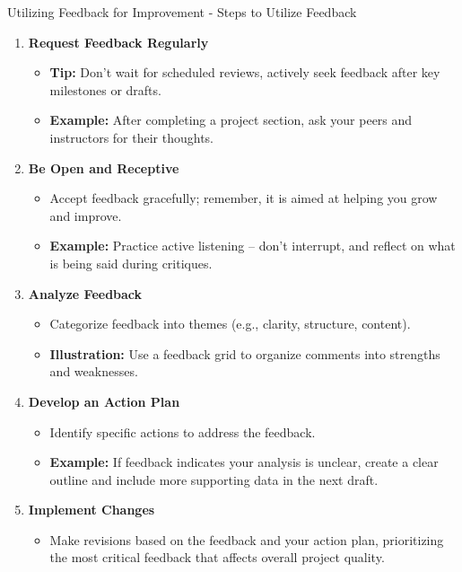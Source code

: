 \documentclass[aspectratio=169]{beamer}
\begin{document}
\begin{frame}[fragile]{Utilizing Feedback for Improvement - Steps to Utilize Feedback}
    \begin{enumerate}
        \item \textbf{Request Feedback Regularly}
            \begin{itemize}
                \item \textbf{Tip:} Don’t wait for scheduled reviews, actively seek feedback after key milestones or drafts.
                \item \textbf{Example:} After completing a project section, ask your peers and instructors for their thoughts.
            \end{itemize}
        
        \item \textbf{Be Open and Receptive}
            \begin{itemize}
                \item Accept feedback gracefully; remember, it is aimed at helping you grow and improve.
                \item \textbf{Example:} Practice active listening – don’t interrupt, and reflect on what is being said during critiques.
            \end{itemize}
        
        \item \textbf{Analyze Feedback}
            \begin{itemize}
                \item Categorize feedback into themes (e.g., clarity, structure, content).
                \item \textbf{Illustration:} Use a feedback grid to organize comments into strengths and weaknesses.
            \end{itemize}

        \item \textbf{Develop an Action Plan}
            \begin{itemize}
                \item Identify specific actions to address the feedback.
                \item \textbf{Example:} If feedback indicates your analysis is unclear, create a clear outline and include more supporting data in the next draft.
            \end{itemize}
        
        \item \textbf{Implement Changes}
            \begin{itemize}
                \item Make revisions based on the feedback and your action plan, prioritizing the most critical feedback that affects overall project quality.
            \end{itemize}
        

\end{enumerate}
\end{frame}
\end{document}
